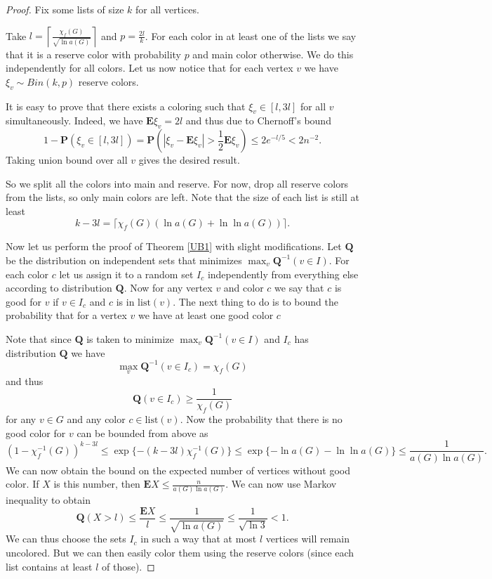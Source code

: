 \documentclass[10pt,a4paper]{article}
\theoremstyle{remark}
\theoremstyle{definition}
\newcommand{\mP}{\mathbf{P}}
\newcommand{\mQ}{\mathbf{Q}}
\newcommand{\mE}{\mathbf{E}}
\newcommand{\lst}{\mathrm{list}}
\newcommand{\skob}[1]{\left(#1\right)}
\begin{document}
\begin{proof}
    Fix some lists of size $k$ for all vertices.
    
    Take $l = \left\lceil\frac{\chi_f(G)}{\sqrt{\ln a(G)}}\right\rceil$ and $p = \frac{2l}{k}$. For each color in at least one of the lists we say that it is a reserve color with probability $p$ and main color otherwise. We do this independently for all colors. Let us now notice that for each vertex $v$ we have $\xi_v \sim Bin(k,p)$ reserve colors. 

    It is easy to prove that there exists a coloring such that $\xi_v \in [l, 3l]$ for all $v$ simultaneously. Indeed, we have $\mE \xi_v = 2l$ and thus due to Chernoff's bound
    $$
       1-\mP(\xi_v \in [l, 3l]) = \mP\skob{|\xi_v - \mE\xi_v| > \frac{1}{2}\mE\xi_v} \leq 2e^{-l/5} < 2n^{-2}.
    $$
    Taking union bound over all $v$ gives the desired result.

    So we split all the colors into main and reserve. For now, drop all reserve colors from the lists, so only main colors are left. Note that the size of each list is still at least 
    $$
        k - 3l = \lceil\chi_f(G)\skob{\ln a(G) + \ln \ln a(G)}\rceil.
    $$

    Now let us perform the proof of Theorem \ref{UB1} with slight modifications. Let $\mathbf{Q}$ be the distribution on independent sets that minimizes $\max_{v} \mQ^{-1}(v \in I)$. For each color $c$ let us assign it to a random set $I_c$ independently from everything else according to distribution $\mQ$. Now for any vertex $v$ and color $c$ we say that $c$ is good for $v$ if $v \in I_c$ and $c$ is in $\lst(v)$. The next thing to do is to bound the probability that for a vertex $v$ we have at least one good color $c$
    
    Note that since $\mQ$ is taken to minimize $\max_{v} \mQ^{-1}(v \in I)$ and $I_c$ has distribution $\mQ$ we have $$\max_{v} \mQ^{-1}(v \in I_c) = \chi_f(G)$$ and thus
    $$
        \mQ(v \in I_c) \geq \frac{1}{\chi_f(G)}
    $$
    for any $v \in G$ and any color $c \in \lst(v)$. Now the probability that there is no good color for $v$ can be bounded from above as 
    $$
    (1 - \chi_f^{-1}(G))^{k-3l} \leq \exp\{-(k-3l)\chi_f^{-1}(G)\} \leq \exp\{-\ln a(G) - \ln \ln a(G)\} \leq \frac{1}{a(G)\ln a(G)}.
    $$
    We can now obtain the bound on the expected number of vertices without good color. If $X$ is this number, then $\mE X \leq \frac{n}{a(G)\ln a(G)}$. We can now use Markov inequality to obtain
    $$
        \mQ(X > l) \leq \frac{\mE X}{l} \leq \frac{1}{\sqrt{\ln a(G)}} \leq \frac{1}{\sqrt{\ln 3}} < 1.
    $$
    We can thus choose the sets $I_c$ in such a way that at most $l$ vertices will remain uncolored. But we can then easily color them using the reserve colors (since each list contains at least $l$ of those). 
\end{proof}





\end{document}
